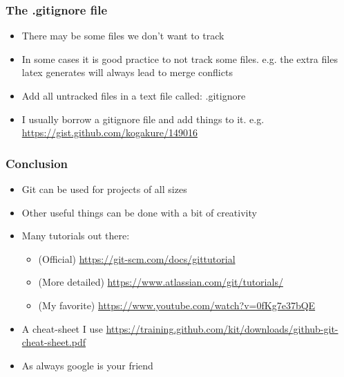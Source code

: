 \documentclass{beamer}
\begin{document}
\begin{frame}
\frametitle{The .gitignore file}
\begin{itemize}
\item There may be some files we don't want to track
\item In some cases it is good practice to not track some files. e.g. the extra files latex generates will always lead to merge conflicts
\item Add all untracked files in a text file called: .gitignore
\item I usually borrow a gitignore file and add things to it. e.g. 
\url{https://gist.github.com/kogakure/149016}
\end{itemize}
\end{frame}

\begin{frame}
\frametitle{Conclusion}
\begin{itemize}
\item Git can be used for projects of all sizes
\item Other useful things can be done with a bit of creativity
\item Many tutorials out there: 
\begin{itemize}
\item (Official) \url{https://git-scm.com/docs/gittutorial} 
\item (More detailed) \url{https://www.atlassian.com/git/tutorials/}
\item (My favorite) \url{https://www.youtube.com/watch?v=0fKg7e37bQE}
\end{itemize}
\item A cheat-sheet I use \url{https://training.github.com/kit/downloads/github-git-cheat-sheet.pdf}
\item As always google is your friend
\end{itemize}
\end{frame}
\end{document}
